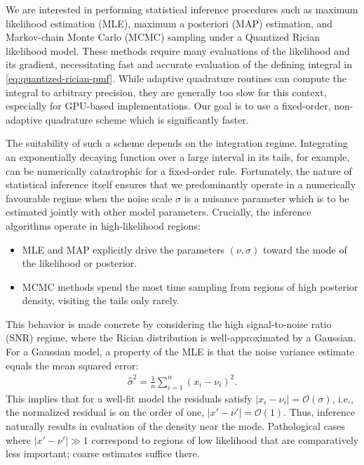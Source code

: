 \documentclass{article}
\begin{document}
We are interested in performing statistical inference procedures such as maximum likelihood estimation (MLE), maximum a posteriori (MAP) estimation, and Markov-chain Monte Carlo (MCMC) sampling under a Quantized Rician likelihood model.
These methods require many evaluations of the likelihood and its gradient, necessitating fast and accurate evaluation of the defining integral in \cref{eq:quantized-rician-pmf}.
While adaptive quadrature routines can compute the integral to arbitrary precision, they are generally too slow for this context, especially for GPU-based implementations.
Our goal is to use a fixed-order, non-adaptive quadrature scheme which is significantly faster.

The suitability of such a scheme depends on the integration regime.
Integrating an exponentially decaying function over a large interval in its tails, for example, can be numerically catastrophic for a fixed-order rule.
Fortunately, the nature of statistical inference itself ensures that we predominantly operate in a numerically favourable regime when the noise scale $\sigma$ is a nuisance parameter which is to be estimated jointly with other model parameters.
Crucially, the inference algorithms operate in high-likelihood regions:
%
\begin{itemize}
  \item MLE and MAP explicitly drive the parameters $(\nu,\sigma)$ toward the mode of the likelihood or posterior.
  \item MCMC methods spend the most time sampling from regions of high posterior density, visiting the tails only rarely.
\end{itemize}
%
This behavior is made concrete by considering the high signal-to-noise ratio (SNR) regime, where the Rician distribution is well-approximated by a Gaussian.
For a Gaussian model, a property of the MLE is that the noise variance estimate equals the mean squared error:
%
\begin{align}
  \hat{\sigma}^2 = \frac{1}{n} \sum_{i=1}^n (x_i - \nu_i)^2.
\end{align}
%
This implies that for a well-fit model the residuals satisfy $|x_i - \nu_i| = \mathcal{O}(\sigma)$, i.e., the normalized residual is on the order of one, $|x' - \nu'| = \mathcal{O}(1)$.
Thus, inference naturally results in evaluation of the density near the mode.
Pathological cases where $|x'-\nu'| \gg 1$ correspond to regions of low likelihood that are comparatively less important;
coarse estimates suffice there.
\end{document}
